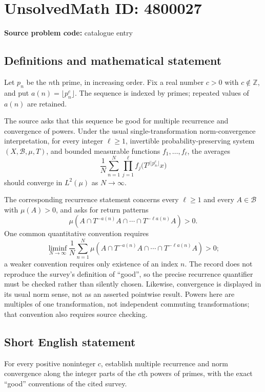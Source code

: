 \documentclass[11pt]{article}
\newcommand{\Z}{\mathbb{Z}}
\begin{document}
\section*{UnsolvedMath ID: 4800027}
\textbf{Source problem code:} catalogue entry
\subsection{Definitions and mathematical statement}
Let $p_n$ be the $n$th prime, in increasing order. Fix a real number $c>0$ with $c\notin\Z$, and put $a(n)=\lfloor p_n^c\rfloor$. The sequence is indexed by primes; repeated values of $a(n)$ are retained.

The source asks that this sequence be good for multiple recurrence and convergence of powers. Under the usual single-transformation norm-convergence interpretation, for every integer $\ell\geq1$, invertible probability-preserving system $(X,\mathcal B,\mu,T)$, and bounded measurable functions $f_1,\ldots,f_\ell$, the averages
\[
\frac1N\sum_{n=1}^N\prod_{j=1}^{\ell}f_j\bigl(T^{j\lfloor p_n^c\rfloor}x\bigr)
\]
should converge in $L^2(\mu)$ as $N\to\infty$.

The corresponding recurrence statement concerns every $\ell\geq1$ and every $A\in\mathcal B$ with $\mu(A)>0$, and asks for return patterns
\[
\mu\left(A\cap T^{-a(n)}A\cap\cdots\cap T^{-\ell a(n)}A\right)>0.
\]
One common quantitative convention requires
\[
\liminf_{N\to\infty}\frac1N\sum_{n=1}^N
\mu\left(A\cap T^{-a(n)}A\cap\cdots\cap T^{-\ell a(n)}A\right)>0;
\]
a weaker convention requires only existence of an index $n$. The record does not reproduce the survey's definition of ``good'', so the precise recurrence quantifier must be checked rather than silently chosen. Likewise, convergence is displayed in its usual norm sense, not as an asserted pointwise result. Powers here are multiples of one transformation, not independent commuting transformations; that convention also requires source checking.
\subsection{Short English statement}
For every positive noninteger $c$, establish multiple recurrence and norm convergence along the integer parts of the $c$th powers of primes, with the exact ``good'' conventions of the cited survey.
\end{document}
